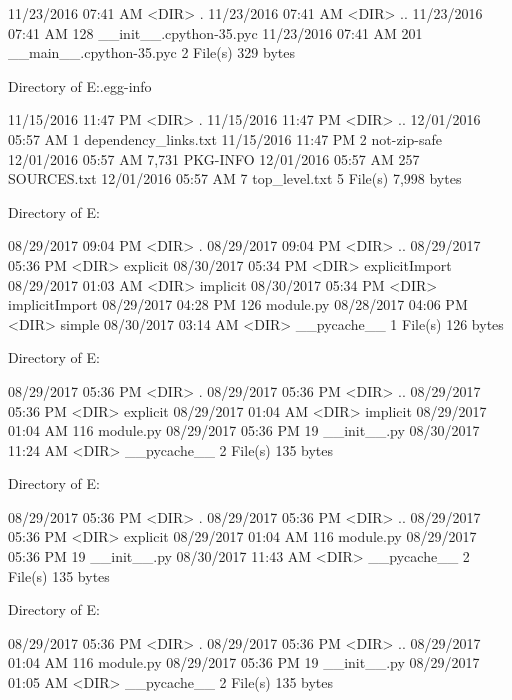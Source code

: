 11/23/2016  07:41 AM    <DIR>          .
11/23/2016  07:41 AM    <DIR>          ..
11/23/2016  07:41 AM               128 __init__.cpython-35.pyc
11/23/2016  07:41 AM               201 __main__.cpython-35.pyc
               2 File(s)            329 bytes

 Directory of E:\Python\apeman\LayMan.egg-info

11/15/2016  11:47 PM    <DIR>          .
11/15/2016  11:47 PM    <DIR>          ..
12/01/2016  05:57 AM                 1 dependency_links.txt
11/15/2016  11:47 PM                 2 not-zip-safe
12/01/2016  05:57 AM             7,731 PKG-INFO
12/01/2016  05:57 AM               257 SOURCES.txt
12/01/2016  05:57 AM                 7 top_level.txt
               5 File(s)          7,998 bytes

 Directory of E:\Python\apeman\mockup

08/29/2017  09:04 PM    <DIR>          .
08/29/2017  09:04 PM    <DIR>          ..
08/29/2017  05:36 PM    <DIR>          explicit
08/30/2017  05:34 PM    <DIR>          explicitImport
08/29/2017  01:03 AM    <DIR>          implicit
08/30/2017  05:34 PM    <DIR>          implicitImport
08/29/2017  04:28 PM               126 module.py
08/28/2017  04:06 PM    <DIR>          simple
08/30/2017  03:14 AM    <DIR>          __pycache__
               1 File(s)            126 bytes

 Directory of E:\Python\apeman\mockup\explicit

08/29/2017  05:36 PM    <DIR>          .
08/29/2017  05:36 PM    <DIR>          ..
08/29/2017  05:36 PM    <DIR>          explicit
08/29/2017  01:04 AM    <DIR>          implicit
08/29/2017  01:04 AM               116 module.py
08/29/2017  05:36 PM                19 __init__.py
08/30/2017  11:24 AM    <DIR>          __pycache__
               2 File(s)            135 bytes

 Directory of E:\Python\apeman\mockup\explicit\explicit

08/29/2017  05:36 PM    <DIR>          .
08/29/2017  05:36 PM    <DIR>          ..
08/29/2017  05:36 PM    <DIR>          explicit
08/29/2017  01:04 AM               116 module.py
08/29/2017  05:36 PM                19 __init__.py
08/30/2017  11:43 AM    <DIR>          __pycache__
               2 File(s)            135 bytes

 Directory of E:\Python\apeman\mockup\explicit\explicit\explicit

08/29/2017  05:36 PM    <DIR>          .
08/29/2017  05:36 PM    <DIR>          ..
08/29/2017  01:04 AM               116 module.py
08/29/2017  05:36 PM                19 __init__.py
08/29/2017  01:05 AM    <DIR>          __pycache__
               2 File(s)            135 bytes

